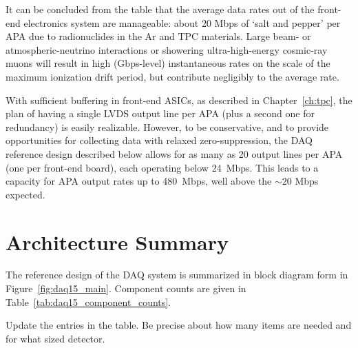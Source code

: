 It can be concluded from the table that the average data rates out of the 
front-end electronics system are manageable: 
about 20 Mbps of `salt and pepper' per APA 
due to radionuclides in the Ar and TPC materials. 
Large beam- or atmospheric-neutrino interactions or 
showering ultra-high-energy cosmic-ray muons will result in high (Gbps-level)
instantaneous rates on the scale of the maximum ionization drift period, 
but contribute negligibly to the average rate.

With sufficient buffering in front-end ASICs, as described 
in Chapter~\ref{ch:tpc}, the plan of having a single LVDS output line per APA 
(plus a second one for redundancy) is easily realizable.  However, 
to be conservative, and to provide opportunities for collecting data with 
relaxed zero-suppression, the DAQ reference design described below 
allows for as many as 20 output lines per APA (one per front-end board), 
each operating below 24~Mbps.  This leads to a capacity for APA output 
rates up to 480~Mbps, well above the $\sim 20$ Mbps expected. 

\section{Architecture Summary}
\label{sec:v5-trig-daq}

The reference design of the DAQ system is summarized in 
block diagram form in Figure~\ref{fig:daq15_main}.  
Component counts are given in Table~\ref{tab:daq15_component_counts}.\
%
%
\begin{editornote}
Update the entries in the table.  Be precise about how many items are
needed and for what sized detector.
\end{editornote}

